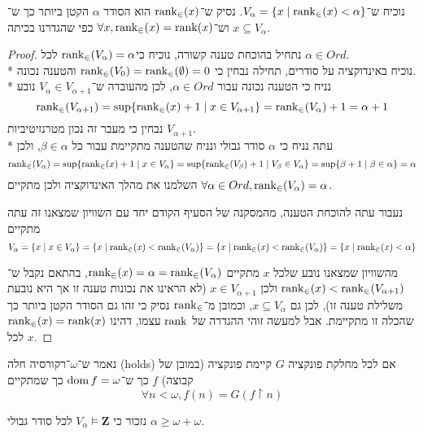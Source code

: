 \Subquestion{}
נוכיח ש־$V_\alpha = \{ x \mid \operatorname{rank}_\in(x) < \alpha \}$.
נסיק ש־$\operatorname{rank}_\in(x)$ הוא הסודר $\alpha$ הקטן ביותר כך ש־$x \subseteq V_\alpha$ וש־$\forall x, \operatorname{rank}_\in(x) = \operatorname{rank}(x)$ כפי שהגדרנו בכיתה.
\begin{proof}
	נתחיל בהוכחת טענה קשורה, נוכיח כי$\operatorname{rank}_\in(V_\alpha) = \alpha$ לכל $\alpha \in Ord$. \\*
	נוכיח באינדוקציה על סודרים, תחילה נבחין כי $\operatorname{rank}_\in(V_0) = \operatorname{rank}_\in(\emptyset) = 0$ והטענה נכונה. \\*
	נניח כי הטענה נכונה עבור $\alpha \in Ord$, לכן מהעובדה ש־$V_\alpha \in V_{\alpha + 1}$ נובע
	\[
		\operatorname{rank}_\in(V_{\alpha + 1})
		= \sup\{ \operatorname{rank}_\in(x) + 1 \mid x \in V_{\alpha + 1} \}
		= \operatorname{rank}_\in(V_\alpha) + 1
		= \alpha + 1
	\]
	נבחין כי מעבר זה נכון מטרנזיטיביות $V_{\alpha + 1}$. \\*
	עתה נניח כי $\alpha$ סודר גבולי ונניח שהטענה מתקיימת עבור כל $\beta \in \alpha$, ולכן
	\[
		\operatorname{rank}_\in(V_{\alpha})
		= \sup\{ \operatorname{rank}_\in(x) + 1 \mid x \in V_\alpha \}
		= \sup\{ \operatorname{rank}_\in(V_\beta) + 1 \mid V_\beta \in V_\alpha \}
		= \sup\{ \beta + 1 \mid \beta \in \alpha \}
		= \alpha
	\]
	השלמנו את מהלך האינדוקציה ולכן מתקיים $\forall \alpha \in Ord, \operatorname{rank}_\in(V_\alpha) = \alpha$.

	נעבור עתה להוכחת הטענה, מהמסקנה של הסעיף הקודם יחד עם השוויון שמצאנו זה עתה מתקיים
	\[
		V_\alpha
		= \{ x \mid x \in V_\alpha \}
		= \{ x \mid \operatorname{rank}_\in(x) < \operatorname{rank}_\in(V_\alpha) \}
		= \{ x \mid \operatorname{rank}_\in(x) < \operatorname{rank}_\in(V_\alpha) \}
		= \{ x \mid \operatorname{rank}_\in(x) < \alpha \}
	\]

	מהשוויון שמצאנו נובע שלכל $x$ מתקיים $\operatorname{rank}_\in(x) = \alpha = \operatorname{rank}_\in(V_\alpha)$, בהתאם נקבל ש־$\operatorname{rank}_\in(x) < \operatorname{rank}_\in(V_{\alpha + 1})$ ולכן $x \in V_{\alpha + 1}$ (לא הראינו את נכונות טענה זו אך היא נובעת משלילת טענה זו),
	לכן גם $x \subseteq V_\alpha$, וכמובן מ־$\operatorname{rank}_\in$ נסיק כי זהו גם הסודר הקטן ביותר כך שהכלה זו מתקיימת.
	אבל למעשה זוהי ההגדרה של $\operatorname{rank}$ עצמו, דהינו $\operatorname{rank}_\in(x) = \operatorname{rank}(x)$ לכל $x$.
\end{proof}

\Question{}
\begin{definition*}
	נאמר ש־$\omega$־רקורסיה חלה (holds) אם לכל מחלקת פונקציה $G$ קיימת פונקציה (במובן של קבוצה) $f$ כך ש־$\operatorname{dom} f = \omega$ כך שמתקיים
	\[
		\forall n < \omega, f(n) = G(f \upharpoonright n)
	\]
\end{definition*}
נזכור כי $V_\alpha \models \textbf{Z}$ לכל סודר גבולי $\alpha \ge \omega + \omega$.

